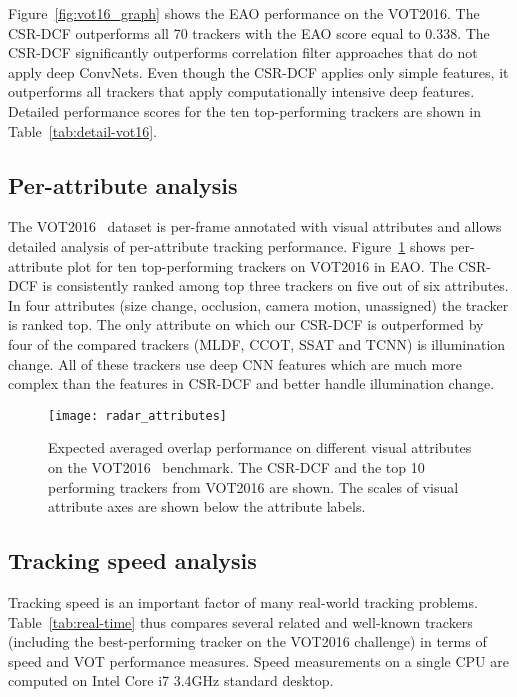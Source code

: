\documentclass[twocolumn]{article}
\begin{document}
Figure~\ref{fig:vot16_graph} shows the EAO performance on the VOT2016. The CSR-DCF outperforms all 70 trackers with the EAO score equal to 0.338. The CSR-DCF significantly outperforms correlation filter approaches that do not apply deep ConvNets. Even though the CSR-DCF applies only simple features, it outperforms all trackers that apply computationally intensive deep features. Detailed performance scores for the ten top-performing trackers are shown in Table~\ref{tab:detail-vot16}.

\subsection{Per-attribute analysis} \label{sec:vot_2016_per_attribute} 

The VOT2016~\citep{kristan_vot2016} dataset is per-frame annotated with visual attributes and allows detailed analysis of per-attribute tracking performance. Figure~\ref{fig:vot16_attributes} shows per-attribute plot for ten top-performing trackers on VOT2016 in EAO. The  CSR-DCF is consistently ranked among top three trackers on five out of six attributes. In four attributes (size change, occlusion, camera motion, unassigned) the tracker is ranked top. The only attribute on which our CSR-DCF is outperformed by four of the compared trackers (MLDF, CCOT, SSAT and TCNN) is illumination change. All of these trackers use deep CNN features which are much more complex than the features in CSR-DCF and better handle illumination change.
\begin{figure}[ht!]
\centering
\texttt{[image: radar\_attributes]}
\caption{Expected averaged overlap performance on different visual attributes on the VOT2016~\citep{kristan_vot2016} benchmark. The  CSR-DCF and the top 10 performing trackers from VOT2016 are shown. The scales of visual attribute axes are shown below the attribute labels.}
\label{fig:vot16_attributes}
\end{figure}

\subsection{Tracking speed analysis} \label{sec:realtime_2016}
 
Tracking speed is an important factor of many real-world tracking problems. Table~\ref{tab:real-time} thus compares several related and well-known trackers (including the best-performing tracker on the VOT2016 challenge) in terms of speed and VOT performance measures. Speed measurements on a single CPU are computed on Intel Core i7 3.4GHz standard desktop. 
\end{document}
